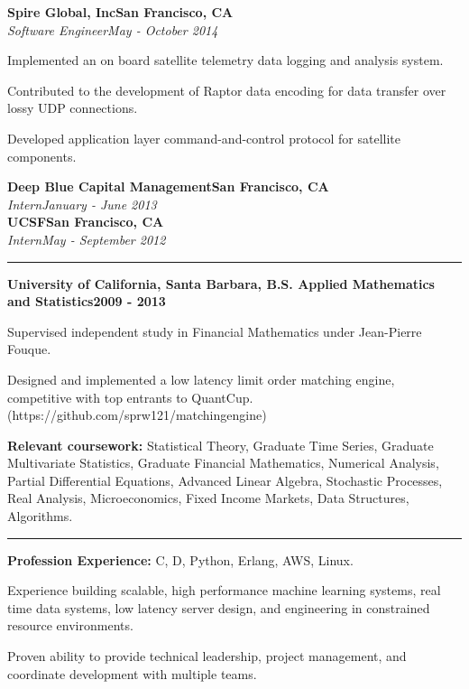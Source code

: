 \documentclass{article}
\newcommand{\ressection}[1]{\noindent{\large\textbf{#1}}\vspace{2pt}\hrule\vspace{4pt}}
\newcommand{\leftandright}[2]{\noindent\textbf{#1}\hfill\textbf{#2}}
\newcommand{\leftandrighti}[2]{\indent\textit{#1}\hfill\textit{#2}}
\begin{document}
\leftandright{Spire Global, Inc}{San Francisco, CA} \\
\leftandrighti{Software Engineer}{May - October 2014}

\begin{itemize*}
\item Implemented an on board satellite telemetry data logging and analysis system.
\item Contributed to the development of Raptor data encoding for data transfer over
  lossy UDP connections.
\item Developed application layer command-and-control protocol for satellite components.
\end{itemize*}

\leftandright{Deep Blue Capital Management}{San Francisco, CA} \\
\leftandrighti{Intern}{January - June 2013}\\

\leftandright{UCSF}{San Francisco, CA} \\
\leftandrighti{Intern}{May - September 2012}\\

\ressection{Education}

\leftandright{University of California, Santa Barbara, \textmd{B.S. Applied
    Mathematics and Statistics}}{2009 - 2013}
\begin{itemize*}
\item Supervised independent study in Financial Mathematics under Jean-Pierre Fouque.
\item Designed and implemented a low latency limit order matching engine,
  competitive with top entrants to QuantCup.
  (https://github.com/sprw121/matching\textunderscore engine)
\item \textbf{Relevant coursework:} Statistical Theory, Graduate Time Series,
  Graduate Multivariate Statistics, Graduate Financial Mathematics,
  Numerical Analysis, Partial Differential Equations,
  Advanced Linear Algebra, Stochastic Processes, Real Analysis,
  Microeconomics, Fixed Income Markets, Data Structures, Algorithms.
\end{itemize*}

\vspace{1.0em}

\ressection{Skills}

\begin{itemize*}
\item \textbf{Profession Experience:} C, D, Python, Erlang, AWS, Linux.
\item Experience building scalable, high performance machine learning systems,
  real time data systems, low latency server design, and engineering in
  constrained resource environments.
\item Proven ability to provide technical leadership, project management,
  and coordinate development with multiple teams.
\end{itemize*}
\end{document}
